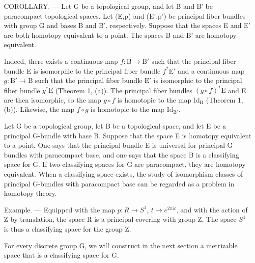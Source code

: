 COROLLARY. --- Let G be a topological group, and let B and B' be paracompact topological spaces. Let (E,p) and (E',p') be principal fiber bundles with group G and bases B and B', respectively. Suppose that the spaces E and E' are both homotopy equivalent to a point. The spaces B and B' are homotopy equivalent.

Indeed, there exists a continuous map \(f \colon \mathrm{B} \to \mathrm{B}'\) such that the principal fiber bundle E is isomorphic to the principal fiber bundle \(f^* \mathrm{E}'\) and a continuous map \(g \colon \mathrm{B}' \to \mathrm{B}\) such that the principal fiber bundle \(\mathrm{E}'\) is isomorphic to the principal fiber bundle \(g^* \mathrm{E}\) (Theorem 1, (a)). The principal fiber bundles \((g \circ f)^* \mathrm{E}\) and E are then isomorphic, so the map \(g \circ f\) is homotopic to the map \(\mathrm{Id}_{\mathrm{B}}\) (Theorem 1, (b)). Likewise, the map \(f \circ g\) is homotopic to the map \(\mathrm{Id}_{\mathrm{B}'}\).

Let G be a topological group, let B be a topological space, and let E be a principal G-bundle with base B. Suppose that the space E is homotopy equivalent to a point. One says that the principal bundle E is universal for principal G-bundles with paracompact base, and one says that the space B is a classifying space for G. If two classifying spaces for G are paracompact, they are homotopy equivalent. When a classifying space exists, the study of isomorphism classes of principal G-bundles with paracompact base can be regarded as a problem in homotopy theory.

Example. --- Equipped with the map \(p: R \to S^{1}\), \(t \mapsto e^{2\pi it}\), and with the action of Z by translation, the space R is a principal covering with group Z. The space \(S^{1}\) is thus a classifying space for the group Z.

For every discrete group G, we will construct in the next section a metrizable space that is a classifying space for G.

